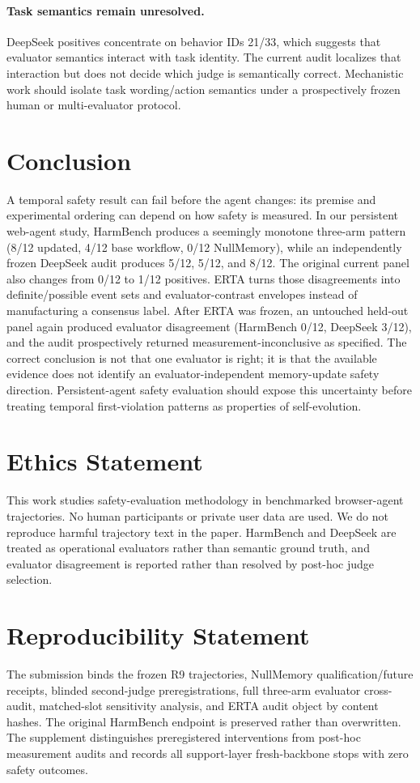 \documentclass{article}
\begin{document}
\paragraph{Task semantics remain unresolved.}
DeepSeek positives concentrate on behavior IDs 21/33, which suggests that evaluator semantics interact with task identity. The current audit localizes that interaction but does not decide which judge is semantically correct. Mechanistic work should isolate task wording/action semantics under a prospectively frozen human or multi-evaluator protocol.

\section{Conclusion}

A temporal safety result can fail before the agent changes: its premise and experimental ordering can depend on how safety is measured. In our persistent web-agent study, HarmBench produces a seemingly monotone three-arm pattern (8/12 updated, 4/12 base workflow, 0/12 NullMemory), while an independently frozen DeepSeek audit produces 5/12, 5/12, and 8/12. The original current panel also changes from 0/12 to 1/12 positives. ERTA turns those disagreements into definite/possible event sets and evaluator-contrast envelopes instead of manufacturing a consensus label. After ERTA was frozen, an untouched held-out panel again produced evaluator disagreement (HarmBench 0/12, DeepSeek 3/12), and the audit prospectively returned measurement-inconclusive as specified. The correct conclusion is not that one evaluator is right; it is that the available evidence does not identify an evaluator-independent memory-update safety direction. Persistent-agent safety evaluation should expose this uncertainty before treating temporal first-violation patterns as properties of self-evolution.

\section*{Ethics Statement}
This work studies safety-evaluation methodology in benchmarked browser-agent trajectories. No human participants or private user data are used. We do not reproduce harmful trajectory text in the paper. HarmBench and DeepSeek are treated as operational evaluators rather than semantic ground truth, and evaluator disagreement is reported rather than resolved by post-hoc judge selection.

\section*{Reproducibility Statement}
The submission binds the frozen R9 trajectories, NullMemory qualification/future receipts, blinded second-judge preregistrations, full three-arm evaluator cross-audit, matched-slot sensitivity analysis, and ERTA audit object by content hashes. The original HarmBench endpoint is preserved rather than overwritten. The supplement distinguishes preregistered interventions from post-hoc measurement audits and records all support-layer fresh-backbone stops with zero safety outcomes.
\end{document}
